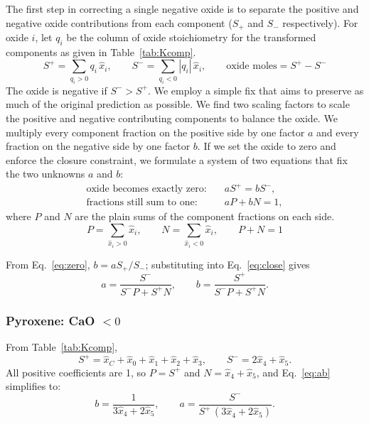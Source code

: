 The first step in correcting a single negative oxide is to separate the positive and negative oxide contributions from each component ($S_+$ and $S_-$ respectively). 
For oxide $i$, let $q_i$ be the column of oxide stoichiometry for the transformed components as given in Table~\ref{tab:Kcomp}. 
\begin{equation}
  S^+ = \sum_{q_i > 0} q_i\,\hat x_i, \qquad
  S^- = \sum_{q_i < 0} |q_i|\,\hat x_i, \qquad
  \text{oxide moles} = S^+ - S^-
\end{equation}
The oxide is negative if $S^- > S^+$. We employ a simple fix that aims to preserve as much of the original prediction as possible. 
We find two scaling factors to scale the positive and negative contributing components to balance the oxide. We multiply every component fraction on
the positive side by one factor $a$ and every fraction on the negative side by one factor $b$. If we set the 
oxide to zero and enforce the closure constraint, we formulate a system of two equations that 
fix the two unknowns $a$ and $b$:
\begin{align}
  \text{oxide becomes exactly zero:}\quad & a S^+ = b S^-, \label{eq:zero}\\
  \text{fractions still sum to one:}\quad & a P + b N = 1, \label{eq:close}
\end{align}
where $P$ and $N$ are the plain sums of the component fractions on each side.
\begin{equation}
  P = \sum_{\hat x_i > 0} \hat x_i, \qquad
  N = \sum_{\hat x_i < 0} \hat x_i, \qquad
  P + N = 1
\end{equation}

From Eq.~\eqref{eq:zero}, $b = a S_+/S_-$; substituting into
Eq.~\eqref{eq:close} gives
\begin{equation}
  a = \frac{S^-}{S^- P + S^+ N}, \qquad
  b = \frac{S^+}{S^- P + S^+ N}.
  \label{eq:ab}
\end{equation}

\subsubsection{Pyroxene: CaO $< 0$}

From Table~\ref{tab:Kcomp},
\begin{equation}
  S^+ = \hat x_C + \hat x_0 + \hat x_1 + \hat x_2 + \hat x_3, \qquad
  S^- = 2\hat x_4 + \hat x_5 .
\end{equation}
All positive coefficients are 1, so $P = S^+$ and $N = \hat x_4 + \hat x_5$, and
Eq.~\eqref{eq:ab} simplifies to:
\begin{equation}
  b = \frac{1}{3\hat x_4 + 2\hat x_5}, \qquad
  a = \frac{S^-}{S^+\,(3\hat x_4 + 2\hat x_5)} .
\end{equation}

